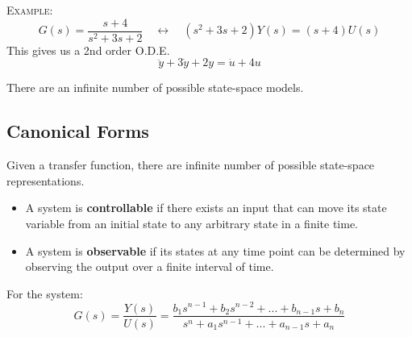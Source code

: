 \documentclass[12pt,a4paper]{article}
\begin{document}
\begin{tcolorbox}[breakable]
\textsc{Example:}
\[G(s) = \frac{s+4}{s^{2}+3s+2} \quad \longleftrightarrow \quad (s^{2}+3s+2)Y(s) = (s+4)U(s)\]
This gives us a 2nd order O.D.E.
\[\ddot{y}+3\dot{y}+2y = \dot{u}+4u\]
\end{tcolorbox}
There are an infinite number of possible state-space models.

\subsection{Canonical Forms}
Given a transfer function, there are infinite number of possible state-space representations.
\begin{itemize}
\item A system is \textbf{controllable} if there exists an input that can move its state variable from an initial state to any arbitrary state in a finite time.
\item A system is \textbf{observable} if its states at any time point can be determined by observing the output over a finite interval of time.
\end{itemize}
For the system:
\[ G(s)=\frac{Y(s)}{U(s)}=\frac{b_{1} s^{n-1}+b_{2} s^{n-2}+... +b_{n-1}s+b_{n}}{s^{n}+a_{1} s^{n-1}+...+a_{n-1}s+a_{n}} \]
\end{document}
